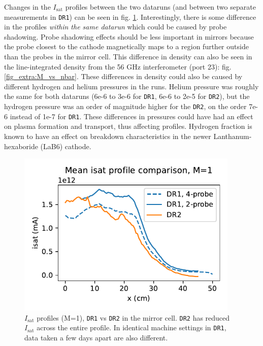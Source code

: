Changes in the $I_\text{sat}$ profiles between the two dataruns (and between two separate measurements in \texttt{DR1}) can be seen in fig. \ref{fig_extra:DR1-DR2_isat_profile_comparison}. Interestingly, there is some difference in the profiles \emph{within the same datarun} which could be caused by probe shadowing. Probe shadowing effects should be less important in mirrors because the probe closest to the cathode magnetically maps to a region further outside than the probes in the mirror cell. This difference in density can also be seen in the line-integrated density from the 56 GHz interferometer (port 23): fig. \ref{fig_extra:M_vs_nbar}. These differences in density could also be caused by different hydrogen and helium pressures in the runs. Helium pressure was roughly the same for both dataruns (6e-6 to 3e-6 for \texttt{DR1}, 6e-6 to 2e-5 for \texttt{DR2}), but the hydrogen pressure was an order of magnitude higher for the \texttt{DR2}, on the order 7e-6 instead of 1e-7 for \texttt{DR1}. These differences in pressures could have had an effect on plasma formation and transport, thus affecting profiles. Hydrogen fraction is known to have an effect on breakdown characteristics in the newer Lanthanum-hexaboride (LaB6) cathode.
\begin{figure}
    \centering
    \includegraphics[width=300pt]{figures/extra/isat_profile_comparison.pdf}
    \caption[$I_\text{sat}$ profiles (M=1), \texttt{DR1} vs \texttt{DR2}]{$I_\text{sat}$ profiles (M=1), \texttt{DR1} vs \texttt{DR2} in the mirror cell. \texttt{DR2} has reduced $I_\text{sat}$ across the entire profile. In identical machine settings in \texttt{DR1}, data taken a few days apart are also different.}
    \label{fig_extra:DR1-DR2_isat_profile_comparison}
\end{figure}

